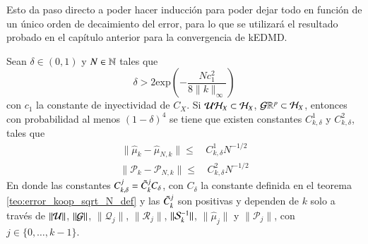Esto da paso directo a poder hacer inducción para poder dejar todo en función de un único orden de decaimiento del error, para lo que se utilizará el resultado probado en el capítulo anterior para la convergencia de kEDMD. 

\begin{teo}
    Sean $\delta \in (0, 1)$ y $N \in \N$ tales que
\[
\delta > 2 \text{exp} \left ( -\frac{Nc_1^2}{8\|k\|_\infty}\right )
\]
con $c_1$ la constante de inyectividad de $C_X$. Si $\U \H_X \subset \H_X$, $\G \R^p \subset \H_X$, entonces con probabilidad al menos $(1 - \delta)^4$ se tiene que existen constantes $C_{k,\delta}^1$ y $C_{k,\delta}^2$, tales que
	\begin{equation*}
		\begin{aligned}
			\| \hat \mu_{k} - \hat \mu_{N,k}  \| \leq & \, C_{k, \delta}^1 N^{-1/2}
		\end{aligned}
	\end{equation*}
	\begin{equation*}
		\begin{aligned}
			\| \mathcal{P}_{k} - \mathcal{P}_{N,k}  \| \leq & \, C_{k, \delta}^2 N^{-1/2} 
		\end{aligned}
	\end{equation*}
	En donde las constantes $C_{k,\delta}^j = \Tilde{C}_k^j C_\delta$, con $C_\delta$ la constante definida en el teorema \ref{teo:error_koop_sqrt_N_def} y las $\Tilde{C}_k^j$ son positivas y dependen de $k$ solo a través de $\| \U \| $, $\| \G \| $, $\| \mathcal{Q}_{j} \| $, $\| \mathcal{R}_{j} \| $, $\| \S_{k}^{-1} \| $, $\| \hat{\mu}_{j} \| $ y $\| \mathcal{P}_{j} \| $, con $j \in \{ 0, \dots, k-1\}$.
    \label{teo:teo_kerKKF_2}
\end{teo}

